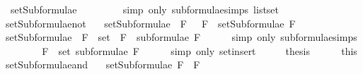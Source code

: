 \begin{isabellebody}
\ \ {\isachardoublequoteopen}setSubformulae\ {\isacharparenleft}{\isasymbottom}{\isacharparenright}\ {\isacharequal}\ {\isacharbraceleft}{\isasymbottom}{\isacharbraceright}{\isachardoublequoteclose}\isanewline
%
\isadelimproof
\ \ \ \ %
\endisadelimproof
%
\isatagproof
{}\isamarkupfalse%
\ {\isacharparenleft}simp\ only{\isacharcolon}\ subformulae{\isachardot}simps{\isacharparenleft}{}{\isacharparenright}\ list{\isachardot}set{\isacharparenright}%
\endisatagproof
{\isafoldproof}%
%
\isadelimproof
\isanewline
%
\endisadelimproof
\isanewline
{}\isamarkupfalse%
\ setSubformulae{\isacharunderscore}not{\isacharcolon}\isanewline
\ \ \ {\isachardoublequoteopen}setSubformulae\ {\isacharparenleft}\isactrlbold {\isasymnot}\ F{\isacharparenright}\ {\isacharequal}\ {\isacharbraceleft}\isactrlbold {\isasymnot}\ F{\isacharbraceright}\ {\isasymunion}\ setSubformulae\ F{\isachardoublequoteclose}\isanewline
%
\isadelimproof
%
\endisadelimproof
%
\isatagproof
{}\isamarkupfalse%
\ {\isacharminus}\isanewline
\ \ \isamarkupfalse%
\ {\isachardoublequoteopen}setSubformulae\ {\isacharparenleft}\isactrlbold {\isasymnot}\ F{\isacharparenright}\ {\isacharequal}\ set\ {\isacharparenleft}\isactrlbold {\isasymnot}\ F\ {\isacharhash}\ subformulae\ F{\isacharparenright}{\isachardoublequoteclose}\isanewline
\ \ \ \ \isamarkupfalse%
\ {\isacharparenleft}simp\ only{\isacharcolon}\ subformulae{\isachardot}simps{\isacharparenleft}{}{\isacharparenright}{\isacharparenright}\isanewline
\ \ \isamarkupfalse%
\ \isamarkupfalse%
\ {\isachardoublequoteopen}{\isasymdots}\ {\isacharequal}\ {\isacharbraceleft}\isactrlbold {\isasymnot}\ F{\isacharbraceright}\ {\isasymunion}\ set\ {\isacharparenleft}subformulae\ F{\isacharparenright}{\isachardoublequoteclose}\isanewline
\ \ \ \ \isamarkupfalse%
\ {\isacharparenleft}simp\ only{\isacharcolon}\ set{\isacharunderscore}insert{\isacharparenright}\isanewline
\ \ \isamarkupfalse%
\ \isamarkupfalse%
\ {\isacharquery}thesis\isanewline
\ \ \ \ \isamarkupfalse%
\ this\isanewline
{}\isamarkupfalse%
%
\endisatagproof
{\isafoldproof}%
%
\isadelimproof
\isanewline
%
\endisadelimproof
\isanewline
{}\isamarkupfalse%
\ setSubformulae{\isacharunderscore}and{\isacharcolon}\ \isanewline
\ \ {\isachardoublequoteopen}setSubformulae\ {\isacharparenleft}F{}\ \isactrlbold {\isasymand}\ F{}{\isacharparenright}\ \isanewline

\end{isabellebody}
